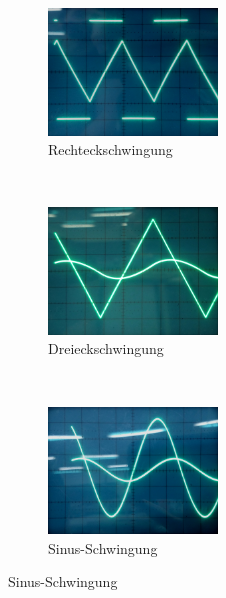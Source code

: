 \begin{figure}[H]
	\centering
	\begin{subfigure}[b]{0.3\textwidth}
		\centering
		\includegraphics[width=4.5cm]{images/integrator-rechteck.jpg}
		\caption{Rechteckschwingung}
	\end{subfigure}
	~
	\begin{subfigure}[b]{0.3\textwidth}
		\centering
		\includegraphics[width=4.5cm]{images/integrator-saegezahn.jpg}
		\caption{Dreieckschwingung}
	\end{subfigure}
	~
	\begin{subfigure}[b]{0.3\textwidth}
		\centering
		\includegraphics[width=4.5cm]{images/integrator-sinus.jpg}
		\caption{Sinus-Schwingung}
	\end{subfigure}
\end{figure}
